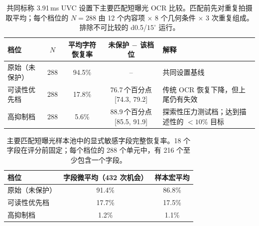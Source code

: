 \documentclass{ieeeaccess}
\begin{document}
\begin{table}[!t]
\caption{共同标称 3.91\,ms UVC 设置下主要匹配短曝光 OCR 比较。匹配前先对重复拍摄取平均；每个档位的 $N=288$ 由 12 个内容项 $\times$ 8 个几何条件 $\times$ 3 次重复组成。排除不可比较的 d0.5/$15^{\circ}$ 运行。}
\label{tab:real_ocr_common}
\centering
\footnotesize
\setlength{\tabcolsep}{4.6pt}
\begin{tabular}{lcccl}
\toprule
档位 & $N$ & 平均字符恢复率 & 未保护 $-$ 该档位 & 解释 \\
\midrule
原始（未保护） & 288 & 94.5\% & -- & 共同设置基线 \\
可读性优先档 & 288 & 17.8\% & 76.7\,个百分点 [74.3, 79.2] & 传统 OCR 恢复下降，但上尾仍有失效 \\
高抑制档 & 288 & 5.6\% & 88.9\,个百分点 [85.5, 91.9] & 探索性压力测试档；达到描述性的 $<10\%$ 目标 \\
\bottomrule
\end{tabular}
\end{table}

\begin{table}[!t]
\caption{主要匹配短曝光样本池中的显式敏感字段完整恢复率。18 个字段在评分前固定；每个档位的 288 个单元中，有 216 个至少包含一个字段。}
\label{tab:explicit_fields}
\centering
\footnotesize
\begin{tabular}{lcc}
\toprule
档位 & 字段微平均（432 次机会） & 样本宏平均 \\
\midrule
原始（未保护） & 91.4\% & 86.8\% \\
可读性优先档 & 17.7\% & 17.5\% \\
高抑制档 & 1.2\% & 1.1\% \\
\bottomrule
\end{tabular}
\end{table}
\end{document}
